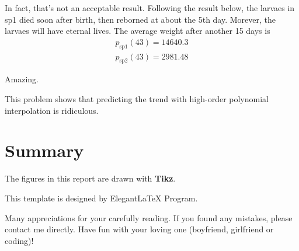 \documentclass[11pt,en]{elegantpaper}
\begin{document}
\begin{center}
\end{center}

In fact, that's not an acceptable result. Following the result below, the larvaes in sp1 died soon after birth, then reborned at about the 5th day. Morever, the larvaes will have eternal lives. The average weight after another 15 days is
\begin{align*}
  p_\text{sp1}(43) = 14640.3\\
  p_\text{sp2}(43) = 2981.48
\end{align*}

Amazing.

This problem shows that predicting the trend with high-order polynomial interpolation is ridiculous.

\section{Summary}

The figures in this report are drawn with \textbf{Tikz}.

This template is designed by Elegant\LaTeX{} Program.

Many appreciations for your carefully reading. If you found any mistakes, please contact me directly. Have fun with your loving one (boyfriend, girlfriend or coding)!
\end{document}
